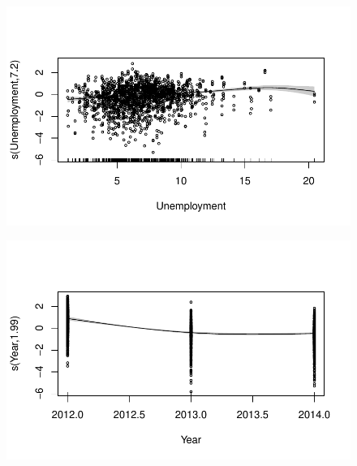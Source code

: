 \documentclass[
  letterpaper,
  DIV=11,
  numbers=noendperiod]{scrartcl}
\begin{document}
\begin{figure}[H]

{\centering \includegraphics{Group34Coursework_files/figure-pdf/unnamed-chunk-17-7.pdf}

}

\end{figure}

\begin{figure}[H]

{\centering \includegraphics{Group34Coursework_files/figure-pdf/unnamed-chunk-17-8.pdf}

}

\end{figure}
\end{document}
